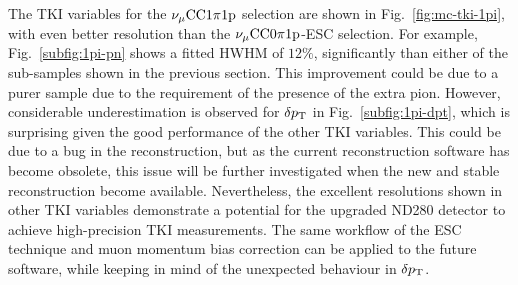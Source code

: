      The TKI variables for the $\nu_{\mu}\textrm{CC}1\pi1\textrm{p}$ selection are shown in Fig.~\ref{fig:mc-tki-1pi}, with even better resolution than the $\nu_{\mu}\textrm{CC}0\pi1\textrm{p}$-ESC selection.
     For example, Fig.~\ref{subfig:1pi-pn} shows a fitted HWHM of $12\%$, significantly than either of the sub-samples shown in the previous section.
     This improvement could be due to a purer sample due to the requirement of the presence of the extra pion.
     However, considerable underestimation is observed for $\delta p_\textrm{T}$ in Fig.~\ref{subfig:1pi-dpt}, which is surprising given the good performance of the other TKI variables.
     This could be due to a bug in the reconstruction, but as the current reconstruction software has become obsolete, this issue will be further investigated when the new and stable reconstruction become available.
     Nevertheless, the excellent resolutions shown in other TKI variables demonstrate a potential for the upgraded ND280 detector to achieve high-precision TKI measurements.
     The same workflow of the ESC technique and muon momentum bias correction can be applied to the future software, while keeping in mind of the unexpected behaviour in $\delta p_\textrm{T}$.
